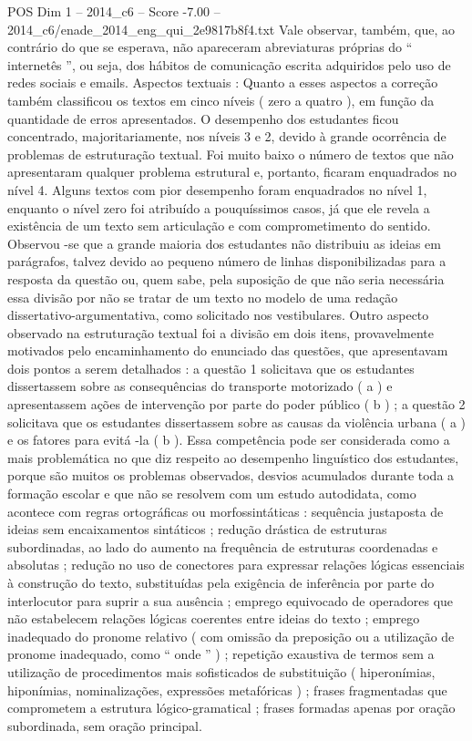 \begin{textsample}{POS Dim 1 – 2014\_c6 – Score -7.00 – 2014\_c6/enade\_2014\_eng\_qui\_2e9817b8f4.txt}
Vale observar, também, que, ao contrário do que se esperava, não apareceram abreviaturas próprias do “ internetês ”, ou seja, dos hábitos de comunicação escrita adquiridos pelo uso de redes sociais e emails.
Aspectos textuais : Quanto a esses aspectos a correção também classificou os textos em cinco níveis ( zero a quatro ), em função da quantidade de erros apresentados.
O desempenho dos estudantes ficou concentrado, majoritariamente, nos níveis 3 e 2, devido à grande ocorrência de problemas de estruturação textual.
Foi muito baixo o número de textos que não apresentaram qualquer problema estrutural e, portanto, ficaram enquadrados no nível 4.
Alguns textos com pior desempenho foram enquadrados no nível 1, enquanto o nível zero foi atribuído a pouquíssimos casos, já que ele revela a existência de um texto sem articulação e com comprometimento do sentido.
Observou -se que a grande maioria dos estudantes não distribuiu as ideias em parágrafos, talvez devido ao pequeno número de linhas disponibilizadas para a resposta da questão ou, quem sabe, pela suposição de que não seria necessária essa divisão por não se tratar de um texto no modelo de uma redação dissertativo-argumentativa, como solicitado nos vestibulares.
Outro aspecto observado na estruturação textual foi a divisão em dois itens, provavelmente motivados pelo encaminhamento do enunciado das questões, que apresentavam dois pontos a serem detalhados : a questão 1 solicitava que os estudantes dissertassem sobre as consequências do transporte motorizado ( a ) e apresentassem ações de intervenção por parte do poder público ( b ) ; a questão 2 solicitava que os estudantes dissertassem sobre as causas da violência urbana ( a ) e os fatores para evitá -la ( b ).
Essa competência pode ser considerada como a mais problemática no que diz respeito ao desempenho linguístico dos estudantes, porque são muitos os problemas observados, desvios acumulados durante toda a formação escolar e que não se resolvem com um estudo autodidata, como acontece com regras ortográficas ou morfossintáticas : sequência justaposta de ideias sem encaixamentos sintáticos ; redução drástica de estruturas subordinadas, ao lado do aumento na frequência de estruturas coordenadas e absolutas ; redução no uso de conectores para expressar relações lógicas essenciais à construção do texto, substituídas pela exigência de inferência por parte do interlocutor para suprir a sua ausência ; emprego equivocado de operadores que não estabelecem relações lógicas coerentes entre ideias do texto ; emprego inadequado do pronome relativo ( com omissão da preposição ou a utilização de pronome inadequado, como “ onde ” ) ; repetição exaustiva de termos sem a utilização de procedimentos mais sofisticados de substituição ( hiperonímias, hiponímias, nominalizações, expressões metafóricas ) ; frases fragmentadas que comprometem a estrutura lógico-gramatical ; frases formadas apenas por oração subordinada, sem oração principal.

\end{textsample}
